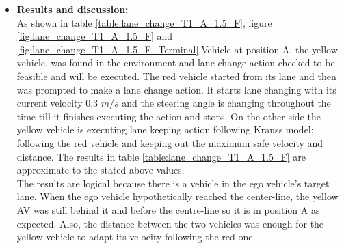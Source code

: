 \begin{enumerate}
\begin{itemize}
             \item \textbf{Results and discussion:} \\
                       As shown in table \ref{table:lane_change_T1_A_1.5_F}, figure \ref{fig:lane_change_T1_A_1.5_F} and \ref{fig:lane_change_T1_A_1.5_F_Terminal},Vehicle at position A, the yellow vehicle, was found in the environment and lane change action checked to be feasible and will be executed. The red vehicle started from its lane and then was prompted to make a lane change action. It starts lane changing with its current velocity 0.3 \(m/s\) and the steering angle is changing throughout the time till it finishes executing the action and stops. On the other side the yellow vehicle is executing lane keeping action following Krauss model; following the red vehicle and keeping out the maximum safe velocity and distance. The results in table \ref{table:lane_change_T1_A_1.5_F} are approximate to the stated above values.\\
                       The results are logical because there is a vehicle in the ego vehicle's target lane. When the ego vehicle hypothetically reached the center-line, the yellow AV was still behind it and before the centre-line so it is in position A as expected. Also, the distance between the two vehicles was enough for the yellow vehicle to adapt its velocity following the red one.\\



\end{itemize}
\end{enumerate}
